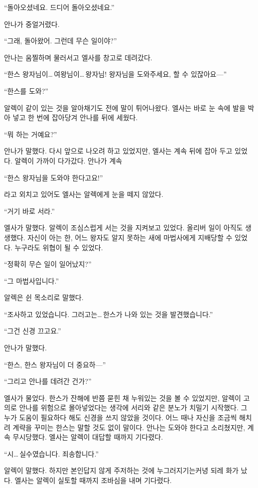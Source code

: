 ``돌아오셨네요. 드디어 돌아오셨네요.''

안나가 중얼거렸다.

``그래, 돌아왔어. 그런데 무슨 일이야?''

안나는 움찔하며 물러서고 엘사를 창고로 데려갔다.

``한스 왕자님이\ldots\,여왕님이\ldots\,왕자님! 왕자님을 도와주세요, 할 수 있잖아요—''

``한스를 도와?''

알렉이 같이 있는 것을 알아채기도 전에 말이 튀어나왔다. 엘사는 바로 눈 속에 발을 박아 넣고 한 번에 잡아당겨 안나를 뒤에 세웠다.

``뭐 하는 거예요?''

안나가 말했다. 다시 앞으로 나오려 하고 있었지만, 엘사는 계속 뒤에 잡아 두고 있었다. 알렉이 가까이 다가갔다. 안나가 계속

``한스 왕자님을 도와야 한다고요!''

라고 외치고 있어도 엘사는 알렉에게 눈을 떼지 않았다.

``거기 바로 서라.''

엘사가 말했다. 알렉이 조심스럽게 서는 것을 지켜보고 있었다. 올리버 일이 아직도 생생했다. 자신이 아는 한, 어느 왕자도 알지 못하는 새에 마법사에게 지배당할 수 있었다. 누구라도 위협이 될 수 있었다.

``정확히 무슨 일이 일어났지?''

``그 마법사입니다.''

알렉은 쉰 목소리로 말했다.

``조사하고 있었습니다. 그러고는\ldots\,한스가 나와 있는 것을 발견했습니다.''

``그건 신경 끄고요.''

안나가 말했다.

``한스, 한스 왕자님이 더 중요하—''

``그리고 안나를 데려간 건가?''

엘사가 물었다. 한스가 잔해에 반쯤 묻힌 채 누워있는 것을 볼 수 있었지만, 알렉이 고의로 안나를 위험으로 몰아넣었다는 생각에 서리와 같은 분노가 치밀기 시작했다. 그 누가 도움이 필요하다 해도 신경을 쓰지 않았을 것이다. 어느 때나 자신을 조금씩 해치려 계략을 꾸미는 한스는 말할 것도 없이 말이다. 안나는 도와야 한다고 소리쳤지만, 계속 무시당했다. 엘사는 알렉이 대답할 때까지 기다렸다.

``시\ldots\,실수였습니다. 죄송합니다.''

알렉이 말했다. 하지만 본인답지 않게 주저하는 것에 누그러지기는커녕 되레 화가 났다. 엘사는 알렉이 실토할 때까지 조바심을 내며 기다렸다.

